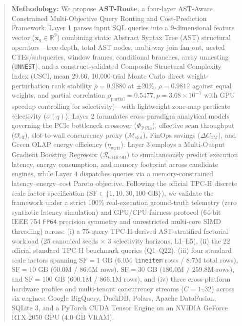 \documentclass[10pt,a4paper]{article}
\begin{document}
\begin{quote}
\textbf{Methodology:} We propose \textbf{AST-Route}, a four-layer AST-Aware Constrained Multi-Objective Query Routing and Cost-Prediction Framework. Layer 1 parses input SQL queries into a 9-dimensional feature vector ($\mathbf{x}_q \in \mathbb{R}^9$) combining static Abstract Syntax Tree (AST) structural operators---tree depth, total AST nodes, multi-way join fan-out, nested CTEs/subqueries, window frames, conditional branches, array unnesting (\texttt{UNNEST}), and a construct-validated Composite Structural Complexity Index (CSCI, mean $29.66$, 10,000-trial Monte Carlo direct weight-perturbation rank stability $\bar{\rho}=0.9880$ at $\pm 20\%$, $\rho=0.9812$ against equal weights, and partial correlation $\rho_{\text{partial}}=0.5477, p=3.68\times 10^{-7}$ with GPU speedup controlling for selectivity)---with lightweight zone-map predicate selectivity ($\sigma(q)$). Layer 2 formulates cross-paradigm analytical models governing the PCIe bottleneck crossover ($\Phi_{\text{PCIe}}$), effective scan throughput ($\Theta_{\text{eff}}$), slot-to-wall concurrency proxy ($\mathcal{M}_{\text{slot}}$), FinOps savings ($\Delta C_{\text{1M}}$), and Green OLAP energy efficiency ($\eta_{\text{watt}}$). Layer 3 employs a Multi-Output Gradient Boosting Regressor ($\mathcal{R}_{\text{GBR-9D}}$) to simultaneously predict execution latency, energy consumption, and memory footprint across candidate engines, while Layer 4 dispatches queries via a memory-constrained latency--energy--cost Pareto objective. Following the official TPC-H discrete scale factor specification ($\text{SF} \in \{1, 10, 30, 100\text{ GB}\}$), we validate the framework under a strict 100\% real-execution ground-truth telemetry (zero synthetic latency simulation) and GPU/CPU fairness protocol (64-bit IEEE 754 \texttt{FP64} precision symmetry and unrestricted multi-core SIMD threading) across: (i) a 75-query TPC-H-derived AST-stratified factorial workload (25 canonical seeds $\times$ 3 selectivity horizons, L1--L5), (ii) the 22 official standard TPC-H benchmark queries (Q1--Q22), (iii) four standard scale factors spanning $\text{SF}=1\text{ GB}$ ($6.0\text{M}$ \texttt{lineitem} rows / $8.7\text{M}$ total rows), $\text{SF}=10\text{ GB}$ ($60.0\text{M}$ / $86.6\text{M}$ rows), $\text{SF}=30\text{ GB}$ ($180.0\text{M}$ / $259.8\text{M}$ rows), and $\text{SF}=100\text{ GB}$ ($600.1\text{M}$ / $866.1\text{M}$ rows), and (iv) three cross-platform hardware profiles and multi-tenant concurrency streams ($C=1\text{--}32$) across six engines: Google BigQuery, DuckDB, Polars, Apache DataFusion, SQLite 3, and a PyTorch CUDA Tensor Engine on an NVIDIA GeForce RTX 2050 GPU ($4.0\text{ GB}$ VRAM).\\[0.25em]

\end{quote}
\end{document}
